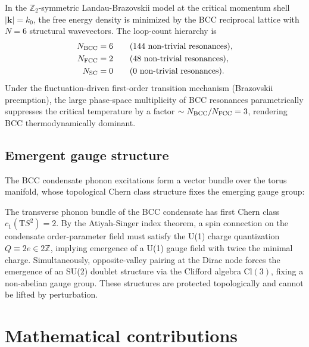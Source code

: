 \begin{theorem}
\label{thm:bcc_main}
In the $\mathbb{Z}_2$-symmetric Landau-Brazovskii model at the critical momentum shell
$|\mathbf{k}| = k_0$, the free energy density is minimized by the BCC reciprocal lattice
with $N = 6$ structural wavevectors. The loop-count hierarchy is
\begin{equation}
\begin{aligned}
N_{\rm BCC} &= 6 \quad &&\text{(144 non-trivial resonances)}, \\
N_{\rm FCC} &= 2 \quad &&\text{(48 non-trivial resonances)}, \\
N_{\rm SC}  &= 0 \quad &&\text{(0 non-trivial resonances)}.
\end{aligned}
\label{eq:loop_hierarchy}
\end{equation}
Under the fluctuation-driven first-order transition mechanism (Brazovskii preemption), the
large phase-space multiplicity of BCC resonances parametrically suppresses the critical
temperature by a factor $\sim N_{\rm BCC}/N_{\rm FCC} = 3$, rendering BCC thermodynamically
dominant.
\end{theorem}

\subsection{Emergent gauge structure}
The BCC condensate phonon excitations form a vector bundle over the torus manifold, whose
topological Chern class structure fixes the emerging gauge group:

\begin{theorem}
\label{thm:gauge_struct}
The transverse phonon bundle of the BCC condensate has first Chern class $c_1(\mathrm{T}S^2) = 2$.
By the Atiyah-Singer index theorem, a spin connection on the condensate order-parameter field
must satisfy the U(1) charge quantization $Q \equiv 2e \in 2\mathbb{Z}$, implying emergence
of a U(1) gauge field with twice the minimal charge. Simultaneously, opposite-valley pairing
at the Dirac node forces the emergence of an SU(2) doublet structure via the Clifford algebra
$\mathrm{Cl}(3)$, fixing a non-abelian gauge group. These structures are protected topologically
and cannot be lifted by perturbation.
\end{theorem}

\section{Mathematical contributions}

